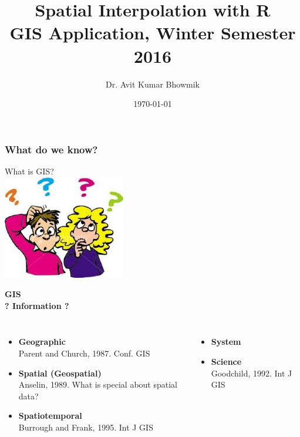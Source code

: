 \documentclass{beamer}
\title[Spatial Interpolation. GIS Application `16]{Spatial Interpolation with R\\
\medskip \tiny{GIS Application, Winter Semester 2016}} %
\author[Avit Bhowmik]{Dr. Avit Kumar Bhowmik \\} %
\institute[Stockholm Resilience] %
{
Stockholm Resilience Centre, Stockholm University \\ %
\medskip
\textit{avit.bhowmik@su.se}%
}
\date{\today} %
\begin{document}
\begin{frame}
\titlepage %
\end{frame}


\begin{frame}
\frametitle{What do we know?}
\centering
\Huge \alert{What is GIS?}\\
\vspace{1cm}
\includegraphics[width=0.4\textwidth]{Figures/Questions.png}
\end{frame}


\begin{frame}
\centering
\Huge \alert{\textbf{GIS}}\\
\pause
\Large \textbf{? Information ?}
\pause
\medskip
\normalsize
\begin{columns}[t]
\begin{itemize}
\item \alert{\textbf{Geographic}}\\
Parent and Church, 1987. Conf. GIS
\item \alert {\textbf {Spatial (Geospatial)}}\\
Anselin, 1989. What is special about spatial data?
\item \alert{\textbf{Spatiotemporal}}\\
Burrough and Frank, 1995. Int J GIS
\end{itemize}
\hspace{2cm}
\pause
{}
\begin{itemize}
\item \alert{\textbf{System}}
\item \alert{\textbf{Science}}\\
Goodchild, 1992. Int J GIS
\end{itemize}
\end{columns}
\end{frame}
\end{document}
